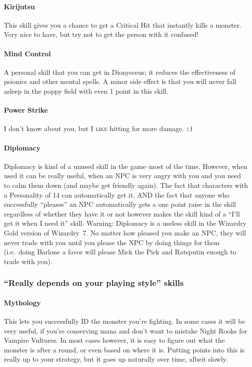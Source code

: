 \documentclass[12pt]{article}
\let\oldparagraph\paragraph
\renewcommand{\paragraph}[1]{\oldparagraph{#1}\mbox{}}
\begin{document}
\paragraph{Kirijutsu} This skill gives you a chance to get a Critical Hit
that instantly kills a monster. Very nice to have, but try not to get the
person with it confused!

\paragraph{Mind Control} A personal skill that you can get in Dionysceus; it
reduces the effectiveness of psionics and other mental spells. A minor side
effect is that you will never fall asleep in the poppy field with even 1
point in this skill.

\paragraph{Power Strike} I don't know about you, but I \textsc{like} hitting
for more damage. \texttt{:)}

\paragraph{Diplomacy} Diplomacy is kind of a unused skill in the game--most
of the time. However, when used it can be really useful, when an NPC is very
angry with you and you need to calm them down (and maybe get friendly
again). The fact that characters with a Personality of 14 can automatically
get it, AND the fact that anyone who successfully ``pleases'' an NPC
automatically gets a one point raise in the skill regardless of whether they
have it or not however makes the skill kind of a ``I'll get it when I need
it'' skill. Warning: Diplomacy is a useless skill in the Wizardry Gold
version of Wizardry~7. No matter how pleased you make an NPC, they will never
trade with you until you please the NPC by doing things for them (i.e.~doing
Barlone a favor will please Mick the Pick and Ratsputin enough to trade with
you).

\subsubsection{\texorpdfstring{``Really depends on your playing style''
skills}{Really depends on your playing style skills}}\label{really-depends-on-your-playing-style-skills}

\paragraph{Mythology} This lets you successfully ID the monster you're
fighting. In some cases it will be very useful, if you're conserving mana and
don't want to mistake Night Rooks for Vampire Vultures. In most cases
however, it is easy to figure out what the monster is after a round, or even
based on where it is. Putting points into this is really up to your strategy,
but it goes up naturally over time, albeit slowly.
\end{document}
